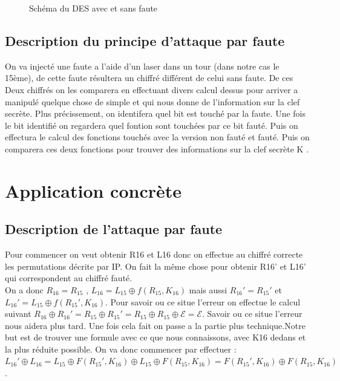 \documentclass[a4paper]{report}
\begin{document}
\begin{figure}[h]
			
			\caption{Schéma du DES avec et sans faute}
			\end{figure}
		
			\section{Description du principe d'attaque par faute}
			
			On va injecté une faute a l'aide d'un laser dans un tour (dans notre cas le 15ème), de cette faute résultera un chiffré différent de celui sans faute.
			De ces Deux chiffrés on les comparera en effectuant divers calcul dessus pour arriver a manipulé quelque chose de simple et qui nous donne de l'information sur la clef secrète.
			Plus précissement, on identifera quel bit est touché par la faute. Une fois le bit identifié on regardera quel fontion sont touchées par ce bit fauté.
			Puis on effectura le calcul des fonctions touchés avec la version non fauté et fauté. Puis on comparera ces deux fonctions pour trouver des informations sur la clef secrète K .
		\chapter{Application concrète}
			\section{Description de l'attaque par faute}
			Pour commencer on veut obtenir R16 et L16 donc on effectue au chiffré correcte les permutations décrite par IP. On fait la même chose pour obtenir R16' et L16' qui correspondent au chiffré fauté.\\
			On a donc $R_{16} = R_{15}$ , $L_{16} = L_{15}\oplus f(R_{15},K_{16})$ mais aussi $R_{16}'=R_{15}'$ et $L_{16}'=L_{15}\oplus f(R_{15}',K_{16})$.
			Pour savoir ou ce situe l'erreur on effectue le calcul suivant $R_{16}\oplus R_{16}' = R_{15}\oplus R_{15}' = R_{15}\oplus R_{15}\oplus \mathcal{E} = \mathcal{E}$. Savoir ou ce situe l'erreur nous aidera plus tard.
			\newline Une fois cela fait on passe a la partie plus technique.Notre but est de trouver une formule avec ce que nous connaissons, avec K16 dedans et la plus réduite possible.
			On va donc commencer par effectuer :\\
			$L_{16}'\oplus L_{16} = L_{15}\oplus F(R_{15}',K_{16}) \oplus L_{15}\oplus F(R_{15},K_{16}) =F(R_{15}',K_{16})\oplus F(R_{15},K_{16})$.\\
			
\end{document}
